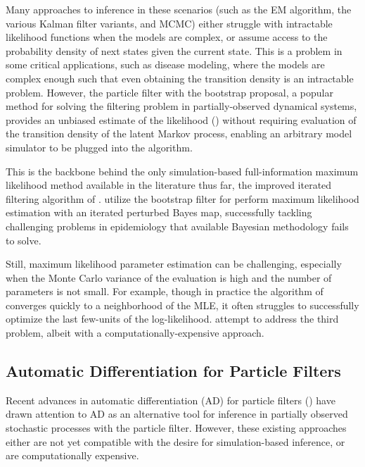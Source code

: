 \documentclass{article}
\begin{document}
Many approaches to inference in these scenarios (such as the EM algorithm, the various Kalman filter variants, and MCMC) either struggle with intractable likelihood functions when the models are complex, or assume access to the probability density of next states given the current state. This is a problem in some critical applications, such as disease modeling, where the models are complex enough such that even obtaining the transition density is an intractable problem. However, the particle filter with the bootstrap proposal, a popular method for solving the filtering problem in partially-observed dynamical systems, provides an unbiased estimate of the likelihood (\cite{delmoral2004feynman}) without requiring evaluation of the transition density of the latent Markov process, enabling an arbitrary model simulator to be plugged into the algorithm.

This is the backbone behind the only simulation-based full-information maximum likelihood method available in the literature thus far, the improved iterated filtering algorithm of \citet{ionides15}. \citet{ionides15} utilize the bootstrap filter for perform maximum likelihood estimation with an iterated perturbed Bayes map, successfully tackling challenging problems in epidemiology that available Bayesian methodology fails to solve. 

Still, maximum likelihood parameter estimation can be challenging, especially when the Monte Carlo variance of the evaluation is high and the number of parameters is not small. For example, though in practice the algorithm of \citet{ionides15} converges quickly to a neighborhood of the MLE, it often struggles to successfully optimize the last few-units of the log-likelihood. \citet{Ionides_mcap} attempt to address the third problem, albeit with a computationally-expensive approach. 

\subsection{Automatic Differentiation for Particle Filters}

Recent advances in automatic differentiation (AD) for particle filters (\cite{blei2018vsmc, jon2018diffpf, corenflos21, scibior2021dpf, doucet2022particlebased}) have drawn attention to AD as an alternative tool for inference in partially observed stochastic processes with the particle filter. However, these existing approaches either are not yet compatible with the desire for simulation-based inference, or are computationally expensive. 
\end{document}

